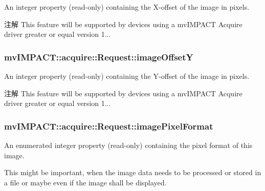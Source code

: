 An integer property {\bfseries }(read-\/only) containing the X-\/offset of the image in pixels. 

\begin{DoxyNote}{注解}
This feature will be supported by devices using a mv\+I\+M\+P\+A\+C\+T Acquire driver greater or equal version 1... 
\end{DoxyNote}
\hypertarget{classmv_i_m_p_a_c_t_1_1acquire_1_1_request_a6f815967e03ba2d74ffbe66006a30ac1}{
\subsubsection[{image\+Offset\+Y}]{ mv\+I\+M\+P\+A\+C\+T\+::acquire\+::\+Request\+::image\+Offset\+Y}}\label{classmv_i_m_p_a_c_t_1_1acquire_1_1_request_a6f815967e03ba2d74ffbe66006a30ac1}


An integer property {\bfseries }(read-\/only) containing the Y-\/offset of the image in pixels. 

\begin{DoxyNote}{注解}
This feature will be supported by devices using a mv\+I\+M\+P\+A\+C\+T Acquire driver greater or equal version 1... 
\end{DoxyNote}
\hypertarget{classmv_i_m_p_a_c_t_1_1acquire_1_1_request_a4b904be99f464613adb54c09cf674ad9}{
\subsubsection[{image\+Pixel\+Format}]{ mv\+I\+M\+P\+A\+C\+T\+::acquire\+::\+Request\+::image\+Pixel\+Format}}\label{classmv_i_m_p_a_c_t_1_1acquire_1_1_request_a4b904be99f464613adb54c09cf674ad9}


An enumerated integer property {\bfseries }(read-\/only) containing the pixel format of this image. 

This might be important, when the image data needs to be processed or stored in a file or maybe even if the image shall be displayed.

